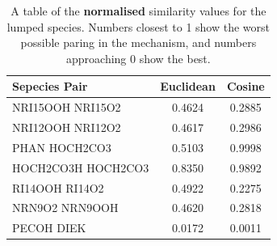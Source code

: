 \begin{table}[H]
\centering
\begin{tabular}{l|cc}
\textbf{Sepecies Pair} & \textbf{Euclidean} & \textbf{Cosine}\\
\hline\hline
NRI15OOH NRI15O2 & 0.4624 & 0.2885 \\
\hline
NRI12OOH NRI12O2 & 0.4617 & 0.2986 \\
\hline
PHAN  HOCH2CO3 & 0.5103 & 0.9998 \\
HOCH2CO3H HOCH2CO3 & 0.8350 & 0.9892 \\
\hline
RI14OOH RI14O2 & 0.4922 & 0.2275 \\
\hline
NRN9O2 NRN9OOH & 0.4620 & 0.2818 \\
\hline
PECOH DIEK & 0.0172 & 0.0011 \\
\end{tabular}
\caption{A table of the \textbf{normalised} similarity values for the lumped species. Numbers closest to 1 show the worst possible paring in the mechanism, and numbers approaching 0 show the best. }
\label{tab:lumppair}
\end{table}


